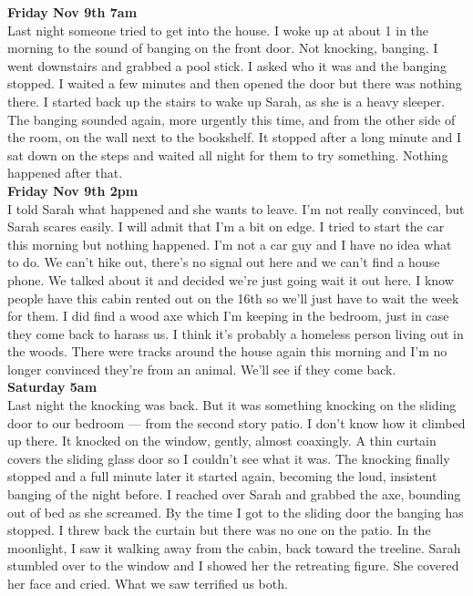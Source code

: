 \documentclass[a5paper]{scrartcl}
\begin{document}
\textbf{Friday Nov 9th 7am}
\\


Last night someone tried to get into the house. I woke up at about 1 in the morning to the sound of banging on the front door. Not knocking, banging. I went downstairs and grabbed a pool stick. I asked who it was and the banging stopped. I waited a few minutes and then opened the door but there was nothing there. I started back up the stairs to wake up Sarah, as she is a heavy sleeper. The banging sounded again, more urgently this time, and from the other side of the room, on the wall next to the bookshelf. It stopped after a long minute and I sat down on the steps and waited all night for them to try something. Nothing happened after that.\\


\textbf{Friday Nov 9th 2pm}
\\


I told Sarah what happened and she wants to leave. I'm not really convinced, but Sarah scares easily. I will admit that I'm a bit on edge. I tried to start the car this morning but nothing happened. I'm not a car guy and I have no idea what to do. We can't hike out, there's no signal out here and we can't find a house phone. We talked about it and decided we're just going wait it out here. I know people have this cabin rented out on the 16th so we'll just have to wait the week for them. I did find a wood axe which I'm keeping in the bedroom, just in case they come back to harass us. I think it's probably a homeless person living out in the woods. There were tracks around the house again this morning and I'm no longer convinced they're from an animal. We'll see if they come back.\\


\textbf{Saturday 5am}
\\


Last night the knocking was back. But it was something knocking on the sliding door to our bedroom --- from the second story patio. I don't know how it climbed up there. It knocked on the window, gently, almost coaxingly. A thin curtain covers the sliding glass door so I couldn't see what it was. The knocking finally stopped and a full minute later it started again, becoming the loud, insistent banging of the night before. I reached over Sarah and grabbed the axe, bounding out of bed as she screamed. By the time I got to the sliding door the banging has stopped. I threw back the curtain but there was no one on the patio. In the moonlight, I saw it walking away from the cabin, back toward the treeline. Sarah stumbled over to the window and I showed her the retreating figure. She covered her face and cried. What we saw terrified us both. \\
\end{document}
